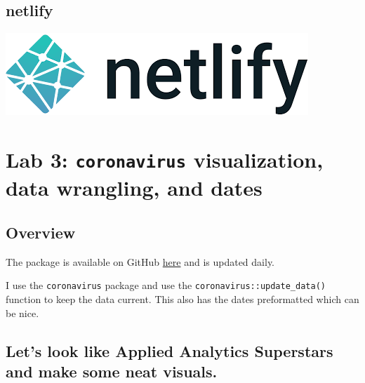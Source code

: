 \documentclass[
]{book}
\begin{document}
\hypertarget{netlify}{%
\section{netlify}\label{netlify}}

\begin{center}\includegraphics{_images/netlify} \end{center}

\hypertarget{lab-3-coronavirus-visualization-data-wrangling-and-dates}{%
\chapter{\texorpdfstring{Lab 3: \texttt{coronavirus} visualization, data wrangling, and dates}{Lab 3: coronavirus visualization, data wrangling, and dates}}\label{lab-3-coronavirus-visualization-data-wrangling-and-dates}}

\hypertarget{overview}{%
\section{Overview}\label{overview}}

The package is available on GitHub \href{https://github.com/RamiKrispin/coronavirus}{here} and is updated daily.

I use the \texttt{coronavirus} package and use the \texttt{coronavirus::update\_data()} function to keep the data current. This also has the dates preformatted which can be nice.

\hypertarget{lets-look-like-applied-analytics-superstars-and-make-some-neat-visuals.}{%
\section{Let's look like Applied Analytics Superstars and make some neat visuals.}\label{lets-look-like-applied-analytics-superstars-and-make-some-neat-visuals.}}
\end{document}
